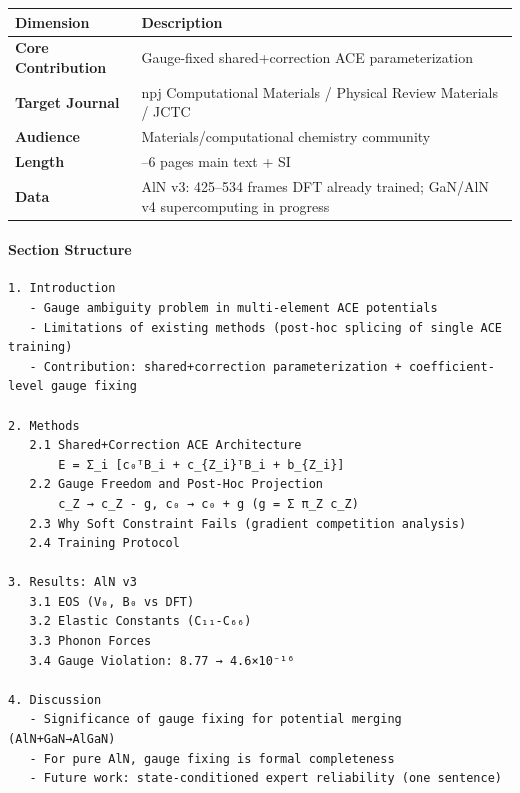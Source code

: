 \documentclass[
  12pt,
]{article}
\begin{document}
\begin{longtable}[]{@{}
  >{\raggedright\arraybackslash}p{}
  >{\raggedright\arraybackslash}p{}@{}}
\toprule\noalign{}
\begin{minipage}[b]{\linewidth}\raggedright
Dimension
\end{minipage} & \begin{minipage}[b]{\linewidth}\raggedright
Description
\end{minipage} \\
\midrule\noalign{}
\endhead
\bottomrule\noalign{}
\endlastfoot
\textbf{Core Contribution} & Gauge-fixed shared+correction ACE parameterization \\
\textbf{Target Journal} & npj Computational Materials / Physical Review Materials / JCTC \\
\textbf{Audience} & Materials/computational chemistry community \\
\textbf{Length} & 4--6 pages main text + SI \\
\textbf{Data} & AlN v3: 425--534 frames DFT already trained; GaN/AlN v4 supercomputing in progress \\
\end{longtable}

\paragraph{Section Structure}\label{section-structure}

\begin{verbatim}
1. Introduction
   - Gauge ambiguity problem in multi-element ACE potentials
   - Limitations of existing methods (post-hoc splicing of single ACE training)
   - Contribution: shared+correction parameterization + coefficient-level gauge fixing

2. Methods
   2.1 Shared+Correction ACE Architecture
       E = Σ_i [c₀ᵀB_i + c_{Z_i}ᵀB_i + b_{Z_i}]
   2.2 Gauge Freedom and Post-Hoc Projection
       c_Z → c_Z - g, c₀ → c₀ + g (g = Σ π_Z c_Z)
   2.3 Why Soft Constraint Fails (gradient competition analysis)
   2.4 Training Protocol

3. Results: AlN v3
   3.1 EOS (V₀, B₀ vs DFT)
   3.2 Elastic Constants (C₁₁-C₆₆)
   3.3 Phonon Forces
   3.4 Gauge Violation: 8.77 → 4.6×10⁻¹⁶

4. Discussion
   - Significance of gauge fixing for potential merging (AlN+GaN→AlGaN)
   - For pure AlN, gauge fixing is formal completeness
   - Future work: state-conditioned expert reliability (one sentence)
\end{verbatim}
\end{document}
